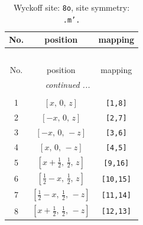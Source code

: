 \documentclass[fleqn,8pt]{jsarticle}
\begin{document}
\begin{longtable}{ccc}
\caption{Wyckoff site: {\tt 8o}, site symmetry: {\tt .m'.}}
 \\
 \hline \hline
No. & position & mapping \\ \hline \endfirsthead

\multicolumn{2}{l}{\tablename\ \thetable{}} \\
 \hline \hline
No. & position & mapping \\ \hline \endhead

 \hline \hline
\multicolumn{2}{r}{\footnotesize\it continued ...} \\ \endfoot

 \hline \hline
\multicolumn{2}{r}{} \\ \endlastfoot

1 & $\left[ x,\, 0,\, z \right]$ & {\tt [1,8]} \\ \hline
2 & $\left[ - x,\, 0,\, z \right]$ & {\tt [2,7]} \\ \hline
3 & $\left[ - x,\, 0,\, - z \right]$ & {\tt [3,6]} \\ \hline
4 & $\left[ x,\, 0,\, - z \right]$ & {\tt [4,5]} \\ \hline
5 & $\left[ x + \frac{1}{2},\, \frac{1}{2},\, z \right]$ & {\tt [9,16]} \\ \hline
6 & $\left[ \frac{1}{2} - x,\, \frac{1}{2},\, z \right]$ & {\tt [10,15]} \\ \hline
7 & $\left[ \frac{1}{2} - x,\, \frac{1}{2},\, - z \right]$ & {\tt [11,14]} \\ \hline
8 & $\left[ x + \frac{1}{2},\, \frac{1}{2},\, - z \right]$ & {\tt [12,13]} \\
\end{longtable}
\renewcommand{\arraystretch}{1.2}
\end{document}
